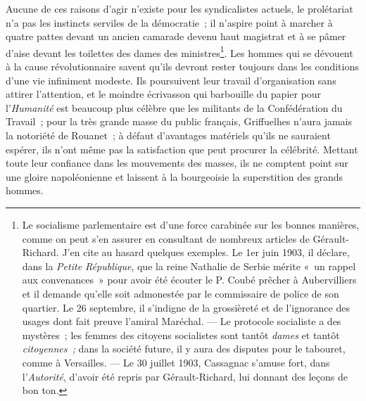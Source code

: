 \documentclass[french,twoside]{book} %
\begin{document}
Aucune de ces raisons d’agir n’existe pour les syndicalistes actuels, le prolétariat n’a pas les instincts serviles de la démocratie ; il n’aspire point à marcher à quatre pattes devant un ancien camarade devenu haut magistrat et à se pâmer d’aise devant les toilettes des dames des ministres\footnote{ \noindent Le socialisme parlementaire est d’une force carabinée sur les bonnes manières, comme on peut s’en assurer en consultant de nombreux articles de Gérault-Richard. J’en cite au hasard quelques exemples. Le 1er juin 1903, il déclare, dans la \emph{Petite République}, que la reine Nathalie de Serbie mérite « un rappel aux convenances » pour avoir été écouter le P. Coubé prêcher à Aubervilliers et il demande qu’elle soit admonestée par le commissaire de police de son quartier. Le 26 septembre, il s’indigne de la grossièreté et de l’ignorance des usages dont fait preuve l’amiral Maréchal. — Le protocole socialiste a des mystères ; les femmes des citoyens socialistes sont tantôt \emph{dames} et tantôt \emph{citoyennes ;} dans la société future, il y aura des disputes pour le tabouret, comme à Versailles. — Le 30 juillet 1903, Cassagnac s’amuse fort, dans l’\emph{Autorité}, d’avoir été repris par Gérault-Richard, lui donnant des leçons de bon ton.
 }. Les hommes qui se dévouent à la cause  révolutionnaire savent qu’ils devront rester toujours dans les conditions d’une vie infiniment modeste. Ils poursuivent leur travail d’organisation sans attirer l’attention, et le moindre écrivasson qui barbouille du papier pour l’\emph{Humanité} est beaucoup plus célèbre que les militants de la Confédération du Travail ; pour la très grande masse du public français, Griffuelhes n’aura jamais la notoriété de Rouanet ; à défaut d’avantages matériels qu’ils ne sauraient espérer, ils n’ont même pas la satisfaction que peut procurer la célébrité. Mettant toute leur confiance dans les mouvements des masses, ils ne comptent point sur une gloire napoléonienne et laissent à la bourgeoisie la superstition des grands hommes.\par
\end{document}
